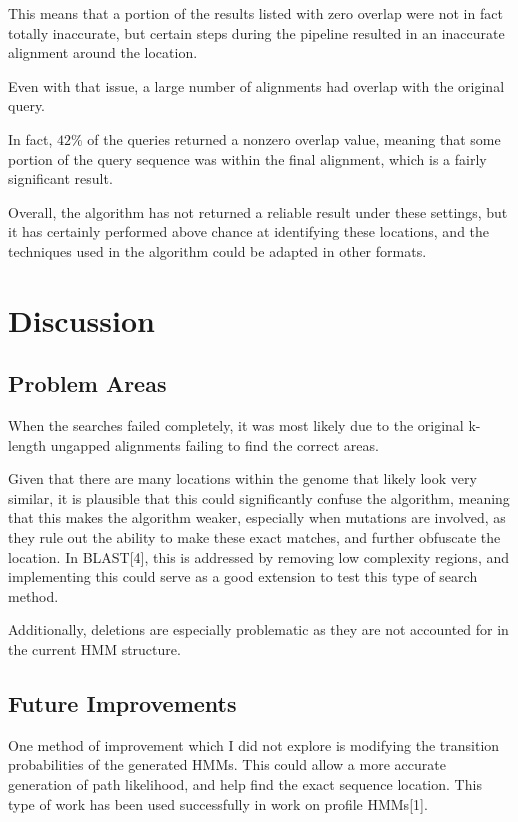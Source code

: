 \documentclass[12pt, conference]{IEEEtran}
\begin{document}
    This means that a portion of the results listed with zero overlap were not in fact totally inaccurate, but certain steps during the pipeline resulted in an inaccurate alignment around the location.

    Even with that issue, a large number of alignments had overlap with the original query.
    
    In fact, $42\%$ of the queries returned a nonzero overlap value, meaning that some portion of the query sequence was within the final alignment, which is a fairly significant result.

    Overall, the algorithm has not returned a reliable result under these settings, but it has certainly performed above chance at identifying these locations, and the techniques used in the algorithm could be adapted in other formats.
	
	
\section{\textbf{Discussion}}

	\subsection{\textbf{Problem Areas}}
	
	When the searches failed completely, it was most likely due to the original k-length ungapped alignments failing to find the correct areas.
	
	Given that there are many locations within the genome that likely look very similar, it is plausible that this could significantly confuse the algorithm, meaning that this makes the algorithm weaker, especially when mutations are involved, as they rule out the ability to make these exact matches, and further obfuscate the location. In BLAST[4], this is addressed by removing low complexity regions, and implementing this could serve as a good extension to test this type of search method.
	
	Additionally, deletions are especially problematic as they are not accounted for in the current HMM structure.

	\subsection{\textbf{Future Improvements}}
	
	One method of improvement which I did not explore is modifying the transition probabilities of the generated HMMs. This could allow a more accurate generation of path likelihood, and help find the exact sequence location. This type of work has been used successfully in work on profile HMMs[1].
	
\end{document}
